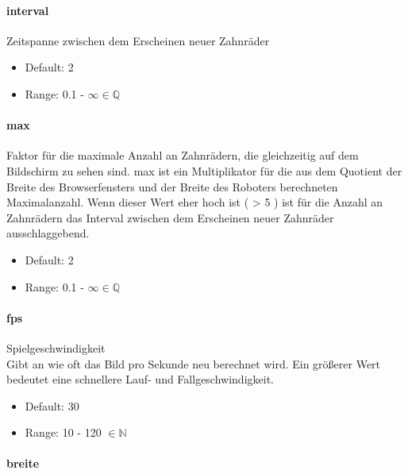 \documentclass[
  paper=a4,
  ,captions=tableheading
]{scrartcl}
\providecommand{\tightlist}{%
  \setlength{\itemsep}{0pt}\setlength{\parskip}{0pt}}
\begin{document}
\hypertarget{interval}{%
\paragraph{interval}\label{interval}}

Zeitspanne zwischen dem Erscheinen neuer Zahnräder

\begin{itemize}
\tightlist
\item
  Default: 2
\item
  Range: 0.1 - \(\infty \in \mathbb{Q}\)
\end{itemize}

\hypertarget{max}{%
\paragraph{max}\label{max}}

Faktor für die maximale Anzahl an Zahnrädern, die gleichzeitig auf dem
Bildschirm zu sehen sind. max ist ein Multiplikator für die aus dem
Quotient der Breite des Browserfensters und der Breite des Roboters
berechneten Maximalanzahl. Wenn dieser Wert eher hoch ist (
\textgreater{} 5 ) ist für die Anzahl an Zahnrädern das Interval
zwischen dem Erscheinen neuer Zahnräder ausschlaggebend.

\begin{itemize}
\tightlist
\item
  Default: 2
\item
  Range: 0.1 - \(\infty \in \mathbb{Q}\)
\end{itemize}

\hypertarget{fps}{%
\paragraph{fps}\label{fps}}

Spielgeschwindigkeit\\
Gibt an wie oft das Bild pro Sekunde neu berechnet wird. Ein größerer
Wert bedeutet eine schnellere Lauf- und Fallgeschwindigkeit.

\begin{itemize}
\tightlist
\item
  Default: 30
\item
  Range: 10 - 120 \(\in \mathbb{N}\)
\end{itemize}

\hypertarget{breite}{%
\paragraph{breite}\label{breite}}
\end{document}
